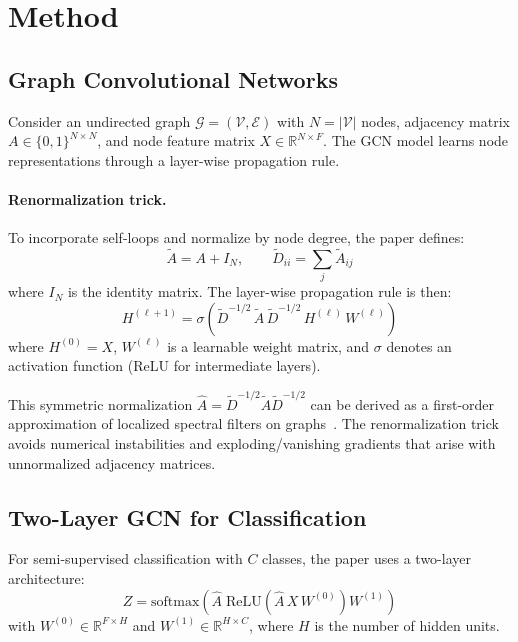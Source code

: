 \documentclass[10pt,twocolumn]{article}
\begin{document}
\section{Method}
\label{sec:method}

\subsection{Graph Convolutional Networks}

Consider an undirected graph $\mathcal{G} = (\mathcal{V}, \mathcal{E})$ with $N = |\mathcal{V}|$ nodes, adjacency matrix $A \in \{0,1\}^{N \times N}$, and node feature matrix $X \in \mathbb{R}^{N \times F}$.
The GCN model learns node representations through a layer-wise propagation rule.

\paragraph{Renormalization trick.}
To incorporate self-loops and normalize by node degree, the paper defines:
\begin{equation}
    \tilde{A} = A + I_N, \qquad \tilde{D}_{ii} = \sum_j \tilde{A}_{ij}
    \label{eq:renorm}
\end{equation}
where $I_N$ is the identity matrix. The layer-wise propagation rule is then:
\begin{equation}
    H^{(\ell+1)} = \sigma\!\left(\tilde{D}^{-1/2}\,\tilde{A}\,\tilde{D}^{-1/2}\,H^{(\ell)}\,W^{(\ell)}\right)
    \label{eq:propagation}
\end{equation}
where $H^{(0)} = X$, $W^{(\ell)}$ is a learnable weight matrix, and $\sigma$ denotes an activation function (ReLU for intermediate layers).

This symmetric normalization $\hat{A} = \tilde{D}^{-1/2}\tilde{A}\tilde{D}^{-1/2}$ can be derived as a first-order approximation of localized spectral filters on graphs~\citep{defferrard2016convolutional}.
The renormalization trick avoids numerical instabilities and exploding/vanishing gradients that arise with unnormalized adjacency matrices.

\subsection{Two-Layer GCN for Classification}

For semi-supervised classification with $C$ classes, the paper uses a two-layer architecture:
\begin{equation}
    Z = \text{softmax}\!\left(\hat{A}\;\text{ReLU}\!\left(\hat{A}\,X\,W^{(0)}\right)W^{(1)}\right)
    \label{eq:two_layer}
\end{equation}
with $W^{(0)} \in \mathbb{R}^{F \times H}$ and $W^{(1)} \in \mathbb{R}^{H \times C}$, where $H$ is the number of hidden units.
\end{document}
